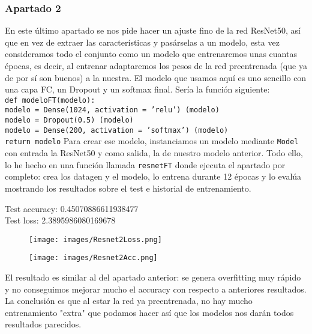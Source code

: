 \documentclass[12pt]{article}
\begin{document}
\subsubsection*{Apartado 2}
En este último apartado se nos pide hacer un ajuste fino de la red ResNet50, así que en vez de extraer las características y pasárselas a un modelo, esta vez consideramos todo el conjunto como un modelo que entrenaremos unas cuantas épocas, es decir, al entrenar adaptaremos los pesos de la red preentrenada (que ya de por sí son buenos) a la nuestra. El modelo que usamos aquí es uno sencillo con una capa FC, un Dropout y un softmax final. Sería la función siguiente:\\
\texttt{def modeloFT(modelo):\\
    modelo = Dense(1024, activation = 'relu') (modelo)\\ 
    modelo = Dropout(0.5) (modelo)\\
    modelo = Dense(200, activation = 'softmax') (modelo)\\
    return modelo}
Para crear ese modelo, instanciamos un modelo mediante \texttt{Model} con entrada la ResNet50 y como salida, la de nuestro modelo anterior. Todo ello, lo he hecho en una función llamada \texttt{resnetFT} donde ejecuta el apartado por completo: crea los datagen y el modelo, lo entrena durante 12 épocas y lo evalúa mostrando los resultados sobre el test e historial de entrenamiento.
\begin{center}
Test accuracy: 0.45070886611938477\\
Test loss: 2.3895986080169678\\
\end{center}
\begin{figure}[H]
\centering
\parbox{8cm}{
\texttt{[image: images/Resnet2Loss.png]}
\caption{}
\label{fig:2figsA}}
\begin{minipage}{8cm}
\texttt{[image: images/Resnet2Acc.png]}
\caption{}
\label{fig:2figsB}
\end{minipage}
\end{figure}
El resultado es similar al del apartado anterior: se genera overfitting muy rápido y no conseguimos mejorar mucho el accuracy con respecto a anteriores resultados. La conclusión es que al estar la red ya preentrenada, no hay mucho entrenamiento "extra" que podamos hacer así que los modelos nos darán todos resultados parecidos.\\
\end{document}
